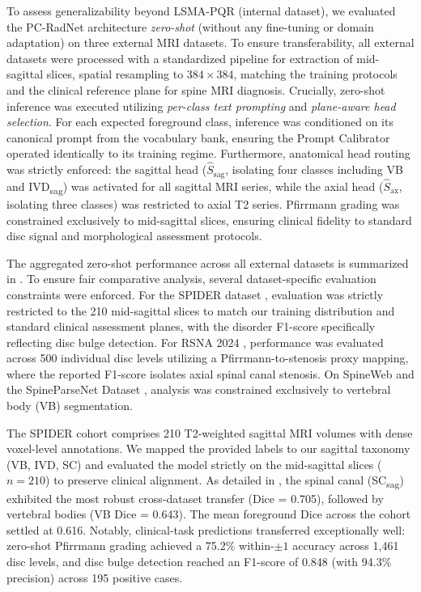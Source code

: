 \documentclass[journal]{IEEEtran}
\newcommand{\modelname}{PC-RadNet}
\begin{document}
To assess generalizability beyond LSMA-PQR (internal dataset), we evaluated the \modelname{} architecture \emph{zero-shot} (without any fine-tuning or domain adaptation) on three external MRI datasets. To ensure transferability, all external datasets were processed with a standardized pipeline for extraction of mid-sagittal slices, spatial resampling to $384{\times}384$, matching the training protocols and the clinical reference plane for spine MRI diagnosis. Crucially, zero-shot inference was executed utilizing \emph{per-class text prompting} and \emph{plane-aware head selection}. For each expected foreground class, inference was conditioned on its canonical prompt from the vocabulary bank, ensuring the Prompt Calibrator operated identically to its training regime. Furthermore, anatomical head routing was strictly enforced: the sagittal head ($\hat{S}_{\text{sag}}$, isolating four classes including VB and IVD\textsubscript{sag}) was activated for all sagittal MRI series, while the axial head ($\hat{S}_{\text{ax}}$, isolating three classes) was restricted to axial T2 series. Pfirrmann grading was constrained exclusively to mid-sagittal slices, ensuring clinical fidelity to standard disc signal and morphological assessment protocols. 

The aggregated zero-shot performance across all external datasets is summarized in . To ensure fair comparative analysis, several dataset-specific evaluation constraints were enforced. For the SPIDER dataset \cite{van2024spider}, evaluation was strictly restricted to the 210 mid-sagittal slices to match our training distribution and standard clinical assessment planes, with the disorder F1-score specifically reflecting disc bulge detection. For RSNA 2024 \cite{rsna_lumbar_2026}, performance was evaluated across 500 individual disc levels utilizing a Pfirrmann-to-stenosis proxy mapping, where the reported F1-score isolates axial spinal canal stenosis. On SpineWeb \cite{spineweb2012} and the SpineParseNet Dataset \cite{spineparsenet2021}, analysis was constrained exclusively to vertebral body (VB) segmentation. 

The SPIDER cohort \cite{van2024spider} comprises 210 T2-weighted sagittal MRI volumes with dense voxel-level annotations. We mapped the provided labels to our sagittal taxonomy (VB, IVD, SC) and evaluated the model strictly on the mid-sagittal slices ($n=210$) to preserve clinical alignment. As detailed in , the spinal canal (SC\textsubscript{sag}) exhibited the most robust cross-dataset transfer (Dice = 0.705), followed by vertebral bodies (VB Dice = 0.643). The mean foreground Dice across the cohort settled at 0.616. Notably, clinical-task predictions transferred exceptionally well: zero-shot Pfirrmann grading achieved a 75.2\% within-$\pm 1$ accuracy across 1,461 disc levels, and disc bulge detection reached an F1-score of 0.848 (with 94.3\% precision) across 195 positive cases.
\end{document}
